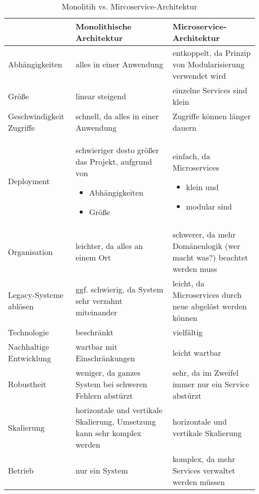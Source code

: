 \begin{table}
	\begin{center}
		\begin{tabular}{p{4cm}p{5cm}p{5cm}}
			& Monolithische Architektur & Microservice-Architektur \\ \hline
			Abhängigkeiten & alles in einer Anwendung & entkoppelt, da Prinzip von Modularisierung verwendet wird \\
			Größe & linear steigend & einzelne Services sind klein \\
			Geschwindigkeit Zugriffe & schnell, da alles in einer Anwendung & Zugriffe können länger dauern \\ 
			Deployment & schwieriger desto größer das Projekt, aufgrund von
			\begin{itemize}
				\item Abhängigkeiten  
				\item Größe \end{itemize}
			 & einfach, da Microservices \begin{itemize}
				\item klein und 
			    \item modular sind \end{itemize} \\
			Organisation & leichter, da alles an einem Ort & schwerer, da mehr Domänenlogik (wer macht was?) beachtet werden muss \\
			Legacy-Systeme ablösen & ggf. schwierig, da System sehr verzahnt miteinander & leicht, da Microservices durch neue abgelöst werden können \\
			Technologie & beschränkt & vielfältig \\
			Nachhaltige Entwicklung & wartbar mit Einschränkungen & leicht wartbar \\
			Robustheit & weniger, da ganzes System bei schweren Fehlern abstürzt & sehr, da im Zweifel immer nur ein Service abstürzt \\
			Skalierung & horizontale und vertikale Skalierung, Umsetzung kann sehr komplex werden &  horizontale und vertikale Skalierung \\
			Betrieb & nur ein System & komplex, da mehr Services verwaltet werden müssen
		\end{tabular}
	\end{center}
	\caption[Monolitih vs. Mircoservice-Architektur]{Monolitih vs. Mircoservice-Architektur}
\end{table}



